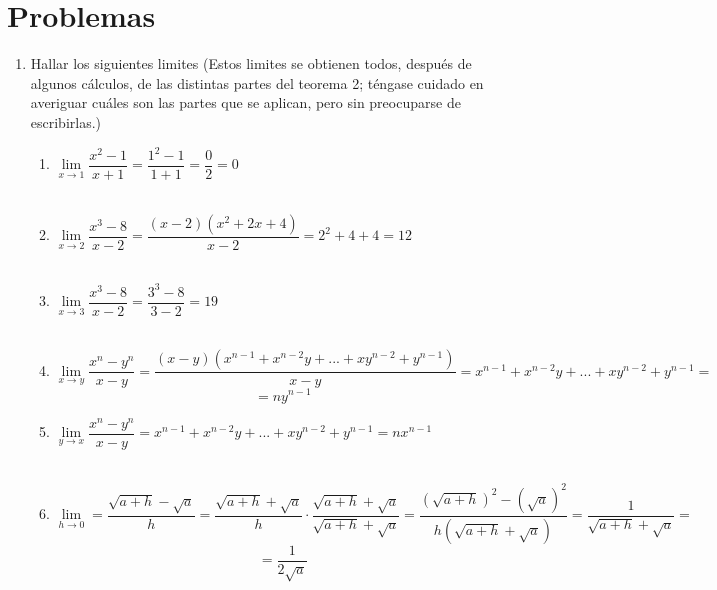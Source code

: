 \section{Problemas}
\begin{enumerate}

\item Hallar los siguientes limites (Estos limites se obtienen todos, después de algunos cálculos, de las distintas partes del teorema 2; téngase cuidado en averiguar cuáles son las partes que se aplican, pero sin preocuparse de escribirlas.)
\begin{enumerate}[\bfseries (i)]

    \item $\lim\limits_{x \to 1}\dfrac{x^2-1}{x+1} = \dfrac{1^2 - 1}{1 + 1} = \dfrac{0}{2} = 0$\\\\

    \item $\lim\limits_{x \to 2} \dfrac{x^3 - 8}{x - 2} = \dfrac{(x-2)(x^2+2x+4)}{x-2} = 2^2+4+4 = 12$\\\\

    \item $\lim\limits_{x \to 3} \dfrac{x^3-8}{x-2} = \dfrac{3^3-8}{3-2} =19$\\\\

    \item $\lim\limits_{x\to y}\dfrac{x^n - y^n}{x-y} = \dfrac{(x-y)(x^{n-1}+x^{n-2}y + ... + xy^{n-2}+y^{n-1})}{x-y} = x^{n-1}+x^{n-2}y + ... + xy^{n-2}+y^{n-1}=$ $$= ny^{n-1}$$

    \item $\lim\limits_{y\to x}\dfrac{x^n - y^n}{x-y} = x^{n-1}+x^{n-2}y + ... + xy^{n-2}+y^{n-1}= nx^{n-1}$\\\\

    \item $\lim\limits_{h\to 0}  = \dfrac{\sqrt{a+h}-\sqrt{a}}{h} = \dfrac{\sqrt{a+h}+\sqrt{a}}{h}\cdot \dfrac{\sqrt{a+h}+\sqrt{a}}{\sqrt{a+h}+\sqrt{a}} = \dfrac{(\sqrt{a+h})^2 - (\sqrt{a})^2}{h(\sqrt{a+h} + \sqrt{a})}=\dfrac{1}{\sqrt{a+h}+\sqrt{a}} = $ $$=\dfrac{1}{2\sqrt{a}}$$\\\\
    \vspace{1cm}


\end{enumerate}
\end{enumerate}
